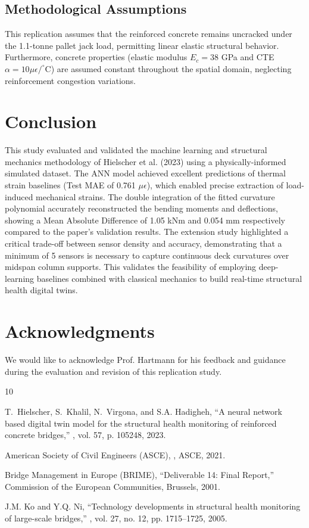 \documentclass[11pt,journal,onecolumn]{IEEEtran}
\begin{document}
\subsection{Methodological Assumptions}
This replication assumes that the reinforced concrete remains uncracked under the 1.1-tonne pallet jack load, permitting linear elastic structural behavior. Furthermore, concrete properties (elastic modulus $E_c = 38$ GPa and CTE $\alpha = 10 \mu\epsilon/^\circ\text{C}$) are assumed constant throughout the spatial domain, neglecting reinforcement congestion variations.

\section{Conclusion}
This study evaluated and validated the machine learning and structural mechanics methodology of Hielscher et al. (2023) using a physically-informed simulated dataset. The ANN model achieved excellent predictions of thermal strain baselines (Test MAE of 0.761 $\mu\epsilon$), which enabled precise extraction of load-induced mechanical strains. The double integration of the fitted curvature polynomial accurately reconstructed the bending moments and deflections, showing a Mean Absolute Difference of 1.05 kNm and 0.054 mm respectively compared to the paper's validation results. The extension study highlighted a critical trade-off between sensor density and accuracy, demonstrating that a minimum of 5 sensors is necessary to capture continuous deck curvatures over midspan column supports. This validates the feasibility of employing deep-learning baselines combined with classical mechanics to build real-time structural health digital twins.

\section*{Acknowledgments}
We would like to acknowledge Prof. Hartmann for his feedback and guidance during the evaluation and revision of this replication study.


\begin{thebibliography}{10}

T.~Hielscher, S.~Khalil, N.~Virgona, and S.A. Hadigheh,
\newblock ``A neural network based digital twin model for the structural health monitoring of reinforced concrete bridges,''
, vol. 57, p. 105248, 2023.

American Society of Civil Engineers (ASCE),
,
\newblock ASCE, 2021.

Bridge Management in Europe (BRIME),
\newblock ``Deliverable 14: Final Report,''
\newblock Commission of the European Communities, Brussels, 2001.

J.M. Ko and Y.Q. Ni,
\newblock ``Technology developments in structural health monitoring of large-scale bridges,''
, vol. 27, no. 12, pp. 1715--1725, 2005.

\end{thebibliography}
\end{document}
